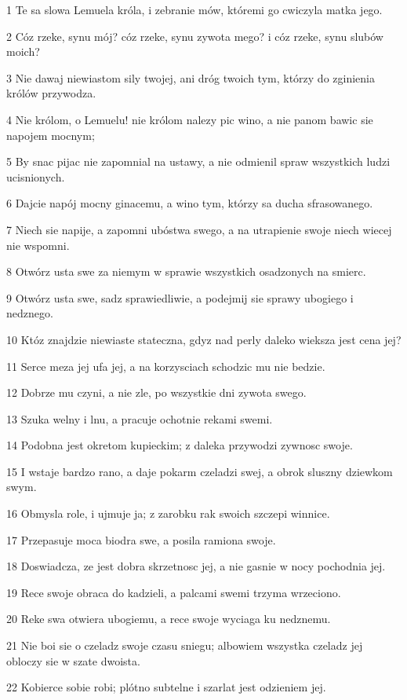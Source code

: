 \par 1 Te sa slowa Lemuela króla, i zebranie mów, któremi go cwiczyla matka jego.
\par 2 Cóz rzeke, synu mój? cóz rzeke, synu zywota mego? i cóz rzeke, synu slubów moich?
\par 3 Nie dawaj niewiastom sily twojej, ani dróg twoich tym, którzy do zginienia królów przywodza.
\par 4 Nie królom, o Lemuelu! nie królom nalezy pic wino, a nie panom bawic sie napojem mocnym;
\par 5 By snac pijac nie zapomnial na ustawy, a nie odmienil spraw wszystkich ludzi ucisnionych.
\par 6 Dajcie napój mocny ginacemu, a wino tym, którzy sa ducha sfrasowanego.
\par 7 Niech sie napije, a zapomni ubóstwa swego, a na utrapienie swoje niech wiecej nie wspomni.
\par 8 Otwórz usta swe za niemym w sprawie wszystkich osadzonych na smierc.
\par 9 Otwórz usta swe, sadz sprawiedliwie, a podejmij sie sprawy ubogiego i nedznego.
\par 10 Któz znajdzie niewiaste stateczna, gdyz nad perly daleko wieksza jest cena jej?
\par 11 Serce meza jej ufa jej, a na korzysciach schodzic mu nie bedzie.
\par 12 Dobrze mu czyni, a nie zle, po wszystkie dni zywota swego.
\par 13 Szuka welny i lnu, a pracuje ochotnie rekami swemi.
\par 14 Podobna jest okretom kupieckim; z daleka przywodzi zywnosc swoje.
\par 15 I wstaje bardzo rano, a daje pokarm czeladzi swej, a obrok sluszny dziewkom swym.
\par 16 Obmysla role, i ujmuje ja; z zarobku rak swoich szczepi winnice.
\par 17 Przepasuje moca biodra swe, a posila ramiona swoje.
\par 18 Doswiadcza, ze jest dobra skrzetnosc jej, a nie gasnie w nocy pochodnia jej.
\par 19 Rece swoje obraca do kadzieli, a palcami swemi trzyma wrzeciono.
\par 20 Reke swa otwiera ubogiemu, a rece swoje wyciaga ku nedznemu.
\par 21 Nie boi sie o czeladz swoje czasu sniegu; albowiem wszystka czeladz jej obloczy sie w szate dwoista.
\par 22 Kobierce sobie robi; plótno subtelne i szarlat jest odzieniem jej.
